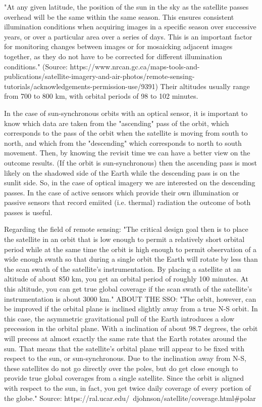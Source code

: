 "At any given latitude, the position of the sun in the sky as the satellite passes overhead will be the same within the same season. This ensures consistent illumination conditions when acquiring images in a specific season over successive years, or over a particular area over a series of days. This is an important factor for monitoring changes between images or for mosaicking adjacent images together, as they do not have to be corrected for different illumination conditions." (Source: https://www.nrcan.gc.ca/maps-tools-and-publications/satellite-imagery-and-air-photos/remote-sensing-tutorials/acknowledgements-permission-use/9391)
Their altitudes usually range from 700 to 800 km, with orbital periods of 98 to 102 minutes.

In the case of sun-synchronous orbits with an optical sensor, it is important to know which data are taken from the "ascending" pass of the orbit, which corresponds to the pass of the orbit when the satellite is moving from south to north, and which from the "descending" which corresponds to north to south movement. Then, by knowing the revisit time we can have a better view on the outcome results. (If the orbit is sun-synchronous) then the ascending pass is most likely on the shadowed side of the Earth while the descending pass is on the sunlit side. So, in the case of optical imagery we are interested on the descending passes. In the case of active sensors which provide their own illumination or passive sensors that record emiited (i.e. thermal) radiation the outcome of both passes is useful.

Regarding the field of remote sensing: "The critical design goal then is to place the satellite in an orbit that is low enough to permit a relatively short orbital period while at the same time the orbit is high enough to permit observation of a wide enough swath so that during a single orbit the Earth will rotate by less than the scan swath of the satellite's instrumentation. By placing a satellite at an altitude of about 850 km, you get an orbital period of roughly 100 minutes. At this altitude, you can get true global coverage if the scan swath of the satellite's instrumentation is about 3000 km." ABOUT THE SSO: "The orbit, however, can be improved if the orbital plane is inclined slightly away from a true N-S orbit. In this case, the asymmetric gravitational pull of the Earth introduces a slow precession in the orbital plane. With a inclination of about 98.7 degrees, the orbit will precess at almost exactly the same rate that the Earth rotates around the sun. That means that the satellite's orbital plane will appear to be fixed with respect to the sun, or sun-synchronous. Due to the inclination away from N-S, these satellites do not go directly over the poles, but do get close enough to provide true global coverages from a single satellite. Since the orbit is aligned with respect to the sun, in fact, you get twice daily coverage of every portion of the globe." Source: https://ral.ucar.edu/~djohnson/satellite/coverage.html#polar

